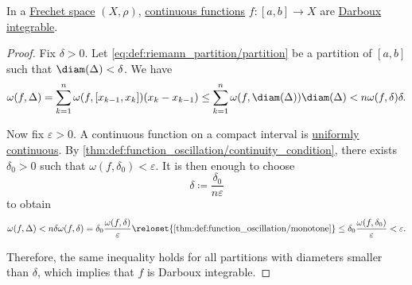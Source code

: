 \begin{proposition}\label{thm:countinuous_functions_integrable}
  In a \hyperref[def:frechet_space]{Frechet space} \( (X, \rho) \), \hyperref[def:global_continuity]{continuous functions} \( f: [a, b] \to X \) are \hyperref[def:darboux_integrability]{Darboux integrable}.
\end{proposition}
\begin{proof}
  Fix \( \delta > 0 \). Let \eqref{eq:def:riemann_partition/partition} be a partition of \( [a, b] \) such that \( \diam(\Delta) < \delta \). We have
  \begin{equation*}
    \omega(f, \Delta)
    =
    \sum_{k=1}^n \omega(f, [x_{k-1}, x_k]) (x_k - x_{k-1})
    \leq
    \sum_{k=1}^n \omega(f, \diam(\Delta)) \diam(\Delta)
    <
    n \omega(f, \delta) \delta.
  \end{equation*}

  Now fix \( \varepsilon > 0 \). A continuous function on a compact interval is \hyperref[def:uniform_continuity]{uniformly continuous}. By \cref{thm:def:function_oscillation/continuity_condition}, there exists \( \delta_0 > 0 \) such that \( \omega(f, \delta_0) < \varepsilon \). It is then enough to choose
  \begin{equation*}
    \delta \coloneqq \frac {\delta_0} {n \varepsilon}
  \end{equation*}
  to obtain
  \begin{equation*}
    \omega(f, \Delta)
    <
    n \delta \omega(f, \delta)
    =
    \delta_0 \frac {\omega(f, \delta)} {\varepsilon}
    \reloset {\ref{thm:def:function_oscillation/monotone}} \leq
    \delta_0 \frac {\omega(f, \delta_0)} {\varepsilon}
    <
    \varepsilon.
  \end{equation*}

  Therefore, the same inequality holds for all partitions with diameters smaller than \( \delta \), which implies that \( f \) is Darboux integrable.
\end{proof}

